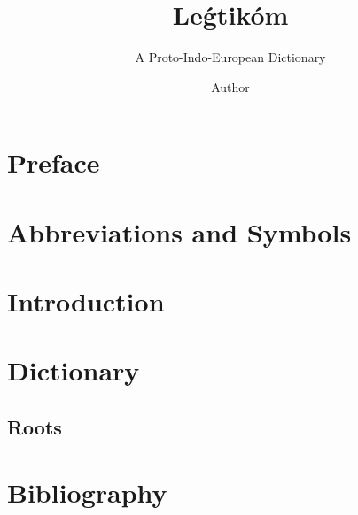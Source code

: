 \documentclass[11pt,twoside,a4paper]{article}
\title{Leǵtikóm}
\author{A Proto-Indo-European Dictionary}
\date{Author}
\begin{document}
\maketitle

\newpage

\tableofcontents
\newpage

\section{Preface}

\section{Abbreviations and Symbols}

\section{Introduction}

\section{Dictionary}

\subsection{Roots}



\section{Bibliography}


\end{document}
